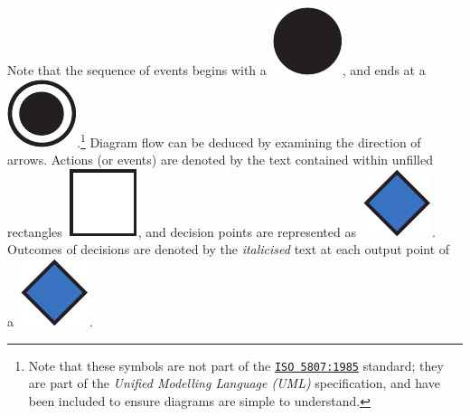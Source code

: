 \begin{preamble}
Note that the sequence of events begins with a~\includegraphics[height=\fontcharht\font`\d]{figures/ch0-example-start.pdf}, and ends at a~\includegraphics[height=\fontcharht\font`\d]{figures/ch0-example-end.pdf}.\footnote{Note that these symbols are not part of the \href{https://www.iso.org/standard/11955.html}{\texttt{ISO 5807:1985}} standard; they are part of the \emph{Unified Modelling Language (UML)} specification, and have been included to ensure diagrams are simple to understand.} Diagram flow can be deduced by examining the direction of arrows. Actions (or events) are denoted by the text contained within unfilled rectangles~\includegraphics[height=\fontcharht\font`\d]{figures/ch0-example-action.pdf}, and decision points are represented as~\includegraphics[height=\fontcharht\font`\d]{figures/ch0-example-decision.pdf}. Outcomes of decisions are denoted by the \emph{italicised} text at each output point of a~\includegraphics[height=\fontcharht\font`\d]{figures/ch0-example-decision.pdf}.

\end{preamble}